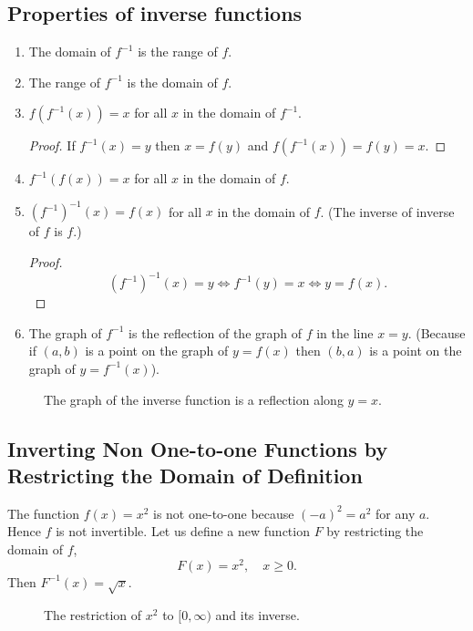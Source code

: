 \documentclass[../main.tex]{subfiles}
\begin{document}
\subsection*{Properties of inverse functions}
\begin{enumerate}
  \item The domain of $f^{-1}$ is the range of $f$.
  \item The range of $f^{-1}$ is the domain of $f$.
  \item $f(f^{-1}(x)) = x$ for all $x$ in the domain of $f^{-1}$.
  \begin{proof}
    If $f^{-1}(x) = y$ then $x = f(y)$ and $f(f^{-1}(x)) = f(y) = x$.
  \end{proof}
  \item $f^{-1}(f(x)) = x$ for all $x$ in the domain of $f$.
  \item $(f^{-1})^{-1}(x) = f(x)$ for all $x$ in the domain of $f$. (The inverse of inverse of $f$ is $f$.)
  \begin{proof}
    \[
      (f^{-1})^{-1}(x) = y \iff f^{-1}(y) = x \iff y = f(x).
    \]
  \end{proof}
  \item The graph of $f^{-1}$ is the reflection of the graph of $f$ in the line $x=y$. (Because if $(a, b)$ is a point on the graph of $y=f(x)$ then $(b, a)$ is a point on the graph of $y = f^{-1}(x)$).
\end{enumerate}
\begin{figure}[H]
  \centering
  
  \caption{The graph of the inverse function is a reflection along $y=x$.}
\end{figure}

\subsection*{Inverting Non One-to-one Functions by Restricting the Domain of Definition}
\begin{minipage}{0.5\textwidth}
  The function $f(x) = x^2$ is not one-to-one because $(-a)^2 = a^2$ for any $a$. Hence $f$ is not invertible. Let us define a new function $F$ by restricting the domain of $f$,
  \[
    F(x) = x^2, \quad x \geq 0.
  \]
  Then $F^{-1}(x) = \sqrt{x}$.
\end{minipage}%
\begin{minipage}{0.5\textwidth}
  \begin{figure}[H]
    \centering
    
    \caption{The restriction of $x^2$ to $[0, \infty)$ and its inverse.}
  \end{figure}
\end{minipage}
\end{document}
